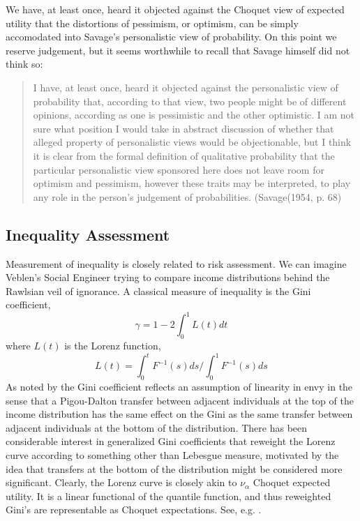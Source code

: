 \documentclass{birkart}
\theoremstyle{definition}
\theoremstyle{remark}
\numberwithin{equation}{section}
\begin{document}
We have, at least once, heard it objected against the Choquet view of
expected utility that the distortions of pessimism, or optimism, can
be simply accomodated into Savage's personalistic view of probability.
On this point we reserve judgement, but it seems worthwhile to recall
that Savage himself did not think so:
\begin{quote} 
I have, at least once, heard it objected against the personalistic view
of probability that, according to that view, two people might be of
different opinions, according as one is pessimistic and the other
optimistic.  I am not sure what position I would take in abstract discussion
of whether that alleged property of personalistic views would be
objectionable, but I think it is clear from the formal definition of
qualitative probability that the particular personalistic view sponsored here
does not leave room for optimism and pessimism, however these traits
may be interpreted, to play any role in the person's judgement of
probabilities.  (Savage(1954, p. 68)
\end{quote} 


\subsection{Inequality Assessment}
Measurement of inequality is closely related to risk assessment.  We can
imagine Veblen's Social Engineer trying to compare income distributions
behind the  Rawlsian veil of ignorance. 
A classical measure of inequality is the Gini coefficient,
\[
\gamma = 1-2 \int_0^1 L (t) dt
\]
where $L(t)$ is the Lorenz function,
\[
L (t ) = \int_0^t F^{-1} (s) ds / \int_0^1 F^{-1}(s) ds
\]
As noted by  the Gini coefficient reflects an assumption
of linearity in envy in the sense that a Pigou-Dalton transfer between
adjacent individuals at the top of the income distribution has the same
effect on the Gini as the same transfer between adjacent individuals at the 
bottom of the distribution.  There has been considerable interest in generalized
Gini coefficients that reweight the Lorenz curve according to something
other than Lebesgue measure, motivated by the idea that transfers at the
bottom of the distribution might be considered more significant.  
Clearly, the Lorenz curve is closely akin
to $\nu_\alpha$ Choquet expected utility.  
It is a linear functional of the quantile function,
and thus reweighted Gini's are representable as
Choquet expectations.  See, e.g. .
\end{document}
